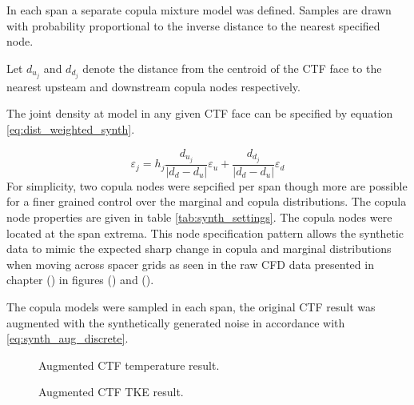 In each span a separate copula mixture model was defined.  Samples are drawn with probability proportional to the inverse distance to the nearest specified node.

Let $d_{u_j}$ and  $d_{d_j}$ denote the distance from the centroid of the CTF face to the nearest upsteam and downstream copula nodes respectively.

The joint density at model in any given CTF face can be specified by equation \ref{eq:dist_weighted_synth}.

\begin{equation}
    \varepsilon_j = h_j \frac{d_{u_j}}{|d_{d} - d_{u}|} \varepsilon_u + \frac{d_{d_j}}{|d_{d} - d_{u}|} \varepsilon_d
    \label{eq:dist_weighted_synth}
\end{equation}
For simplicity, two copula nodes were sepcified per span though more are possible for a finer grained control over the marginal and copula distributions.  The copula node properties are given in table \ref{tab:synth_settings}.  The copula nodes were located at the span extrema. This node specification pattern allows the synthetic data to mimic the expected sharp change in copula and marginal distributions when moving across spacer grids as seen in the raw CFD data presented in chapter () in figures () and ().

The copula models were sampled in each span, the original CTF result was augmented with the synthetically generated noise in accordance with \ref{eq:synth_aug_discrete}.

\begin{figure}[H]%
    \centering
    \qquad
    \caption[Augmented CFD result.]{Augmented CTF temperature result.}%
    \label{fig:ctf_twall_aug}%
\end{figure}

\begin{figure}[H]%
    \centering
    \qquad
    \caption[Augmented CFD TKE result.]{Augmented CTF TKE result.}%
    \label{fig:ctf_tke_aug}%
\end{figure}

